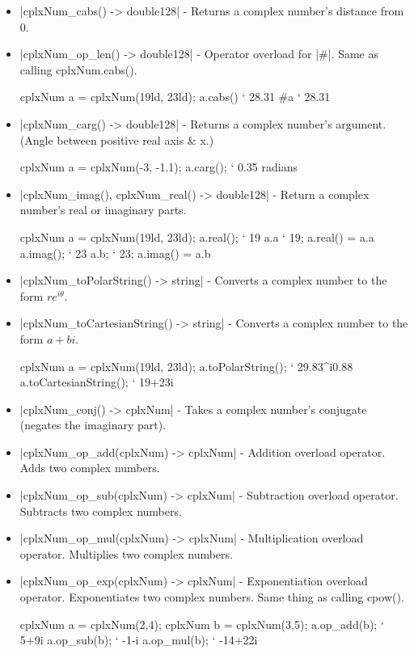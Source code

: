 \documentclass[12pt, letterpaper, oneside]{article}
\begin{document}
	\begin{itemize}
		\item[--] \spverb|cplxNum_cabs() -> double128| - Returns a complex number's distance from 0.
		\item[--] \spverb|cplxNum_op_len() -> double128| - Operator overload for \spverb|#|. Same as calling cplxNum.cabs().
		\begin{spverbatim}
			cplxNum a = cplxNum(19ld, 23ld);
			a.cabs() ` 28.31
			#a ` 28.31
		\end{spverbatim}
		\item[--] \spverb|cplxNum_carg() -> double128| - Returns a complex number's argument. (Angle between positive real axis \& x.)
		\begin{spverbatim}
			cplxNum a = cplxNum(-3, -1.1);
			a.carg(); ` 0.35 radians
		\end{spverbatim}
		\item[--] \spverb|cplxNum_imag(), cplxNum_real() -> double128| - Return a complex number's real or imaginary parts.
		\newline
		\begin{spverbatim}
			cplxNum a = cplxNum(19ld, 23ld);
			a.real(); ` 19
			a.a ` 19; a.real() = a.a
			a.imag(); ` 23
			a.b; ` 23; a.imag() = a.b
		\end{spverbatim}
		\newline
		\item[--] \spverb|cplxNum_toPolarString() -> string| - Converts a complex number to the form $re^{i\theta}$.
		\item[--] \spverb|cplxNum_toCartesianString() -> string| - Converts a complex number to the form $a+bi$.
		\newline
		\begin{spverbatim}
			cplxNum a = cplxNum(19ld, 23ld);
			a.toPolarString(); ` 29.83^i0.88
			a.toCartesianString(); ` 19+23i
		\end{spverbatim}
		\item[--] \spverb|cplxNum_conj() -> cplxNum| - Takes a complex number's conjugate (negates the imaginary part).
		\item[--] \spverb|cplxNum_op_add(cplxNum) -> cplxNum| - Addition overload operator. Adds two complex numbers.
		\item[--] \spverb|cplxNum_op_sub(cplxNum) -> cplxNum| - Subtraction overload operator. Subtracts two complex numbers.
		\item[--] \spverb|cplxNum_op_mul(cplxNum) -> cplxNum| - Multiplication overload operator. Multiplies two complex numbers.
		\item[--] \spverb|cplxNum_op_exp(cplxNum) -> cplxNum| - Exponentiation overload operator. Exponentiates two complex numbers. Same thing as calling cpow().
		\newline
		\begin{spverbatim}
			cplxNum a = cplxNum(2,4);
			cplxNum b = cplxNum(3,5);
			a.op_add(b); ` 5+9i
			a.op_sub(b); ` -1-i
			a.op_mul(b); ` -14+22i
		\end{spverbatim}
	\end{itemize}
\end{document}
